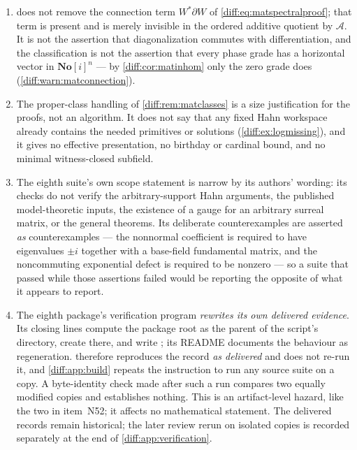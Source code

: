 \documentclass[11pt,letterpaper]{article}
\numberwithin{equation}{section}
\theoremstyle{definition}
\theoremstyle{remark}
\newcommand{\SC}{\mathbf{No}[i]}
\newcommand{\der}{\partial}
\newcommand{\Acl}{\mathcal A}
\begin{document}
\begin{enumerate}[label=\textup{N\arabic*.},leftmargin=3.0em,itemsep=0.35em,start=53]
\cref{diff:thm:matmetric} has no hypothesis relating a horizontal metric to any
fixed norm.
\item {} does not remove the connection term
$W^{*}\der W$ of \cref{diff:eq:matspectralproof}; that term is present and is
merely invisible in the ordered additive quotient by $\Acl$. It is not the
assertion that diagonalization commutes with differentiation, and the
classification is not the assertion that every phase grade has a horizontal
vector in $\SC^{n}$ --- by \cref{diff:cor:matinhom} only the zero grade does
(\cref{diff:warn:matconnection}).
\item The proper-class handling of \cref{diff:rem:matclasses} is a size
justification for the proofs, not an algorithm. It does not say that any fixed
Hahn workspace already contains the needed primitives or solutions
(\cref{diff:ex:logmissing}), and it gives no effective presentation, no
birthday or cardinal bound, and no minimal witness-closed subfield.
\item The eighth suite's own scope statement is narrow by its authors'
wording: its checks do not verify the arbitrary-support Hahn arguments, the
published model-theoretic inputs, the existence of a gauge for an arbitrary
surreal matrix, or the general theorems. Its deliberate counterexamples are
asserted \emph{as} counterexamples --- the nonnormal coefficient is required to
have eigenvalues $\pm i$ together with a base-field fundamental matrix, and the
noncommuting exponential defect is required to be nonzero --- so a suite that
passed while those assertions failed would be reporting the opposite of what it
appears to report.
\item The eighth package's verification program \emph{rewrites its own
delivered evidence}. Its closing lines compute the package root as the parent
of the script's directory, create  there, and write
; its README documents the behaviour as
regeneration.  therefore reproduces the record
\emph{as delivered} and does not re-run it, and \cref{diff:app:build} repeats
the instruction to run any source suite on a copy. A byte-identity check made
after such a run compares two equally modified copies and establishes nothing.
This is an artifact-level hazard, like the two in item~N52; it affects no
mathematical statement. The delivered records remain historical; the later
review rerun on isolated copies is recorded separately at the end of
\cref{diff:app:verification}.
\end{enumerate}
\end{document}
